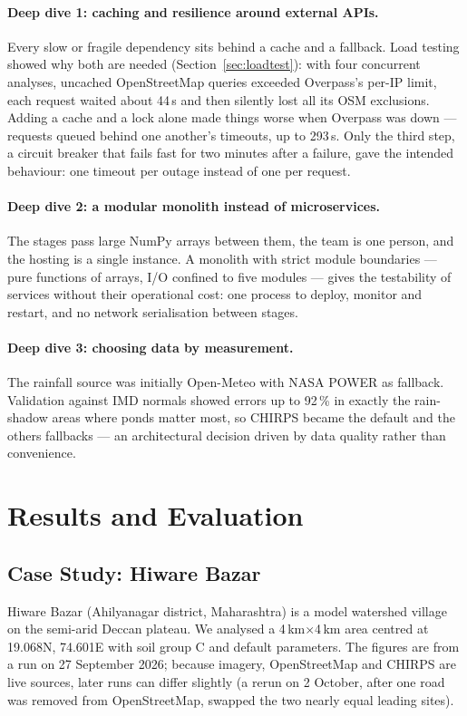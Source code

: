 \documentclass[manuscript,screen,review]{acmart}
\begin{document}
\paragraph{Deep dive 1: caching and resilience around external APIs.} Every slow or fragile
dependency sits behind a cache and a fallback. Load testing showed why both are needed
(Section~\ref{sec:loadtest}): with four concurrent analyses, uncached OpenStreetMap queries
exceeded Overpass's per-IP limit, each request waited about 44\,s and then silently lost all
its OSM exclusions. Adding a cache and a lock alone made things worse when Overpass was down
--- requests queued behind one another's timeouts, up to 293\,s. Only the third step, a
circuit breaker that fails fast for two minutes after a failure, gave the intended behaviour:
one timeout per outage instead of one per request.

\paragraph{Deep dive 2: a modular monolith instead of microservices.} The stages pass large
NumPy arrays between them, the team is one person, and the hosting is a single instance. A
monolith with strict module boundaries --- pure functions of arrays, I/O confined to five
modules --- gives the testability of services without their operational cost: one process to
deploy, monitor and restart, and no network serialisation between stages.

\paragraph{Deep dive 3: choosing data by measurement.} The rainfall source was initially
Open-Meteo with NASA POWER as fallback. Validation against IMD normals showed errors up to
92\,\% in exactly the rain-shadow areas where ponds matter most, so CHIRPS became the default
and the others fallbacks --- an architectural decision driven by data quality rather than
convenience.

\section{Results and Evaluation}
\label{sec:results}

\subsection{Case Study: Hiware Bazar}
Hiware Bazar (Ahilyanagar district, Maharashtra) is a model watershed village on the
semi-arid Deccan plateau. We analysed a 4\,km$\times$4\,km area centred at
19.068\textdegree{}N, 74.601\textdegree{}E with soil group C and default parameters. The
figures are from a run on 27 September 2026; because imagery, OpenStreetMap and CHIRPS are live
sources, later runs can differ slightly (a rerun on 2 October, after one road was removed from
OpenStreetMap, swapped the two nearly equal leading sites).
\end{document}
